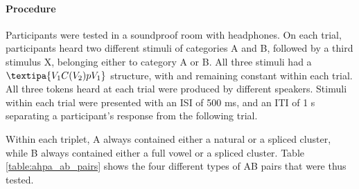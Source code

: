 {\begin{table*}[h!]
\centering
\caption{{\color{blue}Types of AB pairs for Experiment 2. The discrimination accuracy is predicted according to whether epenthetic vowel quality is determined by the quality of flanking vowel (Flank.), coarticulation cues (Coart.), or whether participants experience default  epenthesis (Default) or do not experience epenthesis (No Epenth.). Cases of good discrimination are marked with plus signs.}}
\label{table:ahpa_ab_pairs}
\end{table*}

\paragraph{Procedure}
Participants were tested in a soundproof room with headphones. On each trial, participants heard two different stimuli of categories A and B, followed by a third stimulus X, belonging either to category A or B. All three stimuli had a $\textipa{V_{1}C(V_{2})pV_{1}}$ structure, with  and  remaining constant within each trial.  
All three tokens heard at each trial were produced by different speakers. Stimuli within each trial were presented with an ISI of 500 ms, and an ITI of 1 s separating a participant's response from the following trial.  

Within each triplet, A always contained either a natural or a spliced cluster, while B always contained either a full vowel or a spliced cluster. Table \ref{table:ahpa_ab_pairs} shows the four different types of AB pairs that were thus tested. 

}
